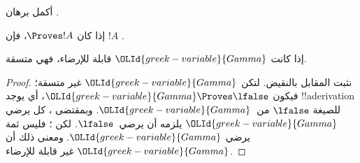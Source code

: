 \documentclass[../../../include/open-logic-section]{subfiles}
\begin{document}
\begin{prob}
  أكمل برهان .
\end{prob}
\tagendprob

\begin{cor}
إذا كان $\Proves !A$، فإن $!A$ .
\end{cor}

\begin{cor}
إذا كانت $\OLId{greek-variable}{Gamma}$ قابلة للإرضاء، فهي متسقة.
\end{cor}

\begin{proof}
نثبت المقابل بالنقيض. لتكن $\OLId{greek-variable}{Gamma}$ غير متسقة؛ فيكون
$\OLId{greek-variable}{Gamma} \Proves \lfalse$، أي يوجد !!a{derivation} للصيغة
$\lfalse$ من~$\OLId{greek-variable}{Gamma}$. وبمقتضى ، كل
يرضي $\OLId{greek-variable}{Gamma}$ يلزمه أن يرضي~$\lfalse$. لكن
؛ فليس ثمة
 يرضي $\OLId{greek-variable}{Gamma}$. ومعنى ذلك أن
$\OLId{greek-variable}{Gamma}$ غير قابلة للإرضاء.
\end{proof}
\end{document}
